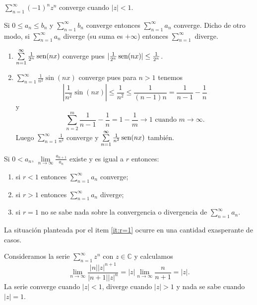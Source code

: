 \begin{ejemplo}{}
$\sum \limits_{n=1}^{\infty} (-1)^n z^n$ converge cuando $|z|<1$.
\end{ejemplo}

\begin{teorema}
Si $0\leq a_n\leq b_n$ y $\sum\limits_{n=1}^{\infty} b_n$ converge entonces $\sum\limits_{n=1}^{\infty}a_n$ converge.
Dicho de otro modo, si $\sum\limits_{n=1}^{\infty} a_n$ diverge (su suma es $+\infty$) entonces 
$\sum\limits_{n=1}^{\infty}$ diverge.
\end{teorema}

\begin{ejemplo}{}
\begin{enumerate}
\item $\sum\limits_{n=1}^{\infty} \frac{1}{2^n} \operatorname{sen}(nx)$ converge pues $|\frac{1}{2^n} \operatorname{sen}(nx)|\leq \frac{1}{2^n}$.
\item $\sum\limits_{n=1}^{\infty} \frac{1}{n^2} \sin(nx)$ converge pues para $n>1$ tenemos
\[
\left|\frac{1}{n^2}\sin(nx)\right|\leq \frac{1}{n^2}\leq \frac{1}{(n-1)n}=\frac{1}{n-1}-\frac{1}{n}
\]
y
\[
\sum\limits_{n=2}^{m}\frac{1}{n-1}-\frac{1}{n}=1-\frac{1}{m}\to 1\mbox{  cuando  } m\to \infty.
\]
Luego $\sum\limits_{n=1}^{\infty} \frac{1}{n^2}$ converge y 
$\sum\limits_{n=1}^{\infty} \frac{1}{n^2} \operatorname{sen}(nx)$ también.
\end{enumerate}
\end{ejemplo}

\begin{teorema}{}
Si $0<a_n$, $\lim\limits_{n \to \infty} \frac{a_{n+1}}{a_n}$ existe y es igual a $r$ entonces: 
\begin{enumerate}
\item si  $r<1$ entonces $\sum\limits_{n=1}^{\infty} a_n$ converge;
\item si $r>1$ entonces $\sum\limits_{n=1}^{\infty} a_n$ diverge;
\item\label{it:r=1} si $r=1$ no se sabe nada sobre la convergencia o divergencia de $\sum\limits_{n=1}^{\infty} a_n$.
\end{enumerate}
\end{teorema}

La situación planteada por el item \ref{it:r=1} ocurre en una cantidad exasperante de casos.

\begin{ejemplo}{}
Consideramos la serie $\sum\limits_{n=1}^{\infty} z^n$ con $z \in \mathbb{C}$ y calculamos
\[
\lim\limits_{n \to \infty} \frac{|n||z|^{n+1}}{|n+1||z|^n}=|z|\lim\limits_{n \to \infty} \frac{n}{n+1}=|z|.
\]
La serie converge cuando $|z|<1$, diverge cuando $|z|>1$ y nada se sabe cuando $|z|=1$.
\end{ejemplo}

